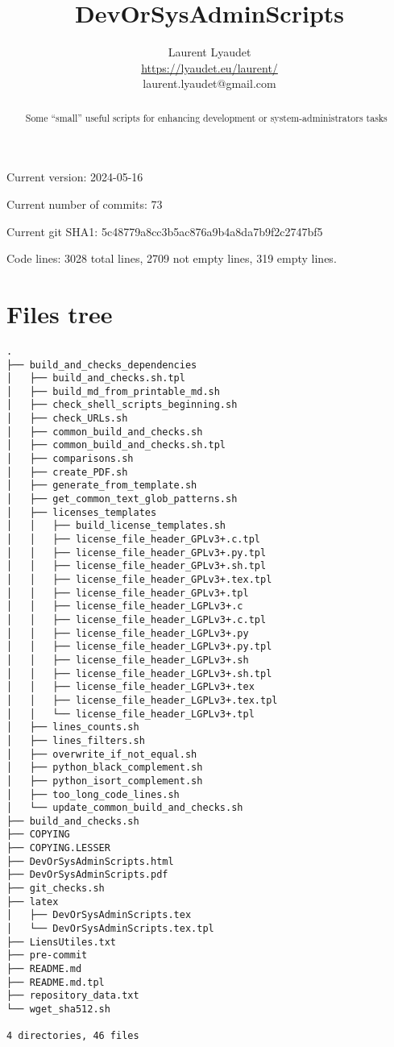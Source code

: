 \documentclass{article}
\begin{document}
\author{
  Laurent Lyaudet\\
  \url{https://lyaudet.eu/laurent/}\\
  laurent.lyaudet@gmail.com
}
\title{DevOrSysAdminScripts}

\maketitle
\begin{abstract}
Some ``small'' useful scripts
for enhancing development or system-administrators tasks
\end{abstract}

Current version: 2024-05-16

Current number of commits: 73

Current git SHA1: 5c48779a8cc3b5ac876a9b4a8da7b9f2c2747bf5

Code lines: 3028 total lines, 2709 not empty lines, 319 empty lines.

\section{Files tree}
\label{section:tree}

\begin{verbatim}
.
├── build_and_checks_dependencies
│   ├── build_and_checks.sh.tpl
│   ├── build_md_from_printable_md.sh
│   ├── check_shell_scripts_beginning.sh
│   ├── check_URLs.sh
│   ├── common_build_and_checks.sh
│   ├── common_build_and_checks.sh.tpl
│   ├── comparisons.sh
│   ├── create_PDF.sh
│   ├── generate_from_template.sh
│   ├── get_common_text_glob_patterns.sh
│   ├── licenses_templates
│   │   ├── build_license_templates.sh
│   │   ├── license_file_header_GPLv3+.c.tpl
│   │   ├── license_file_header_GPLv3+.py.tpl
│   │   ├── license_file_header_GPLv3+.sh.tpl
│   │   ├── license_file_header_GPLv3+.tex.tpl
│   │   ├── license_file_header_GPLv3+.tpl
│   │   ├── license_file_header_LGPLv3+.c
│   │   ├── license_file_header_LGPLv3+.c.tpl
│   │   ├── license_file_header_LGPLv3+.py
│   │   ├── license_file_header_LGPLv3+.py.tpl
│   │   ├── license_file_header_LGPLv3+.sh
│   │   ├── license_file_header_LGPLv3+.sh.tpl
│   │   ├── license_file_header_LGPLv3+.tex
│   │   ├── license_file_header_LGPLv3+.tex.tpl
│   │   └── license_file_header_LGPLv3+.tpl
│   ├── lines_counts.sh
│   ├── lines_filters.sh
│   ├── overwrite_if_not_equal.sh
│   ├── python_black_complement.sh
│   ├── python_isort_complement.sh
│   ├── too_long_code_lines.sh
│   └── update_common_build_and_checks.sh
├── build_and_checks.sh
├── COPYING
├── COPYING.LESSER
├── DevOrSysAdminScripts.html
├── DevOrSysAdminScripts.pdf
├── git_checks.sh
├── latex
│   ├── DevOrSysAdminScripts.tex
│   └── DevOrSysAdminScripts.tex.tpl
├── LiensUtiles.txt
├── pre-commit
├── README.md
├── README.md.tpl
├── repository_data.txt
└── wget_sha512.sh

4 directories, 46 files
\end{verbatim}
\end{document}
